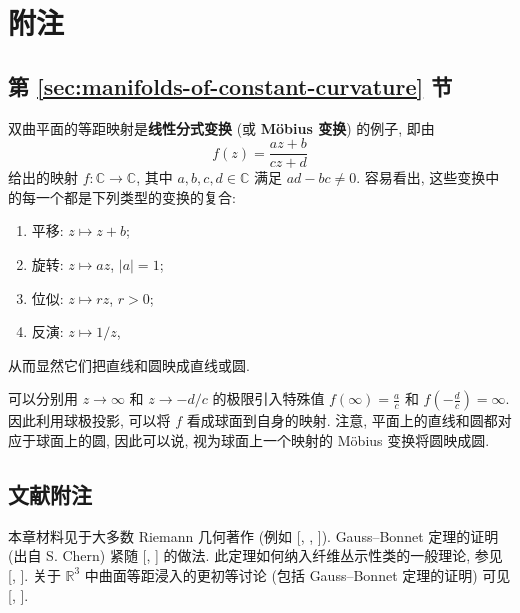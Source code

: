 \section{附注}\label{sec:notes-on-curvature}

\subsection{第 \ref{sec:manifolds-of-constant-curvature} 节}\label{subsec:notes-manifolds-of-constant-curvature}

双曲平面的等距映射是\textbf{线性分式变换} (或 \textbf{Möbius 变换}) 的例子, 即由
\[
  f(z)=\frac{az+b}{cz+d}
\]
给出的映射 $f:\mathbb{C}\to\mathbb{C}$, 其中 $a,b,c,d\in\mathbb{C}$ 满足 $ad-bc\ne0$. 容易看出, 这些变换中的每一个都是下列类型的变换的复合:
\begin{enumerate}[label=(\arabic*),leftmargin=*]
\item 平移: $z\mapsto z+b$;
\item 旋转: $z\mapsto az$, $|a|=1$;
\item 位似: $z\mapsto rz$, $r>0$;
\item 反演: $z\mapsto1/z$,
\end{enumerate}
从而显然它们把直线和圆映成直线或圆.

可以分别用 $z\to\infty$ 和 $z\to-d/c$ 的极限引入特殊值 $f(\infty)=\frac ac$ 和 $f(-\frac dc)=\infty$. 因此利用球极投影, 可以将 $f$ 看成球面到自身的映射. 注意, 平面上的直线和圆都对应于球面上的圆, 因此可以说, 视为球面上一个映射的 Möbius 变换将圆映成圆.

\subsection{文献附注}\label{subsec:curvature-literature}

本章材料见于大多数 Riemann 几何著作 (例如 [, , ]). Gauss–Bonnet 定理的证明 (出自 S. Chern) 紧随 [, ] 的做法. 此定理如何纳入纤维丛示性类的一般理论, 参见 [, ]. 关于 $\mathbb{R}^3$ 中曲面等距浸入的更初等讨论 (包括 Gauss–Bonnet 定理的证明) 可见 [, ].
